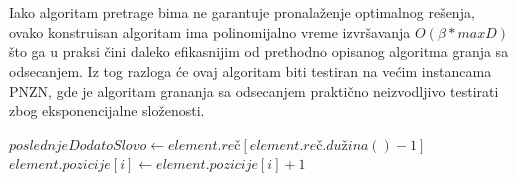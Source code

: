 \documentclass[12pt,oneside]{memoir}
\begin{document}
\begin{algorithm}
  \caption{$\textbf{RedukujBim}\bm{(\mathcal{B}\textbf{, }prona\textbf{đ}enaNadniska)}$}
  \label{alg:redukujbim}
  \end{algorithm}
\\
\\
Iako algoritam pretrage bima ne garantuje pronalaženje optimalnog rešenja, ovako konstruisan algoritam
ima polinomijalno vreme izvršavanja $O(\beta*maxD)$ što ga u praksi čini daleko efikasnijim od
prethodno opisanog algoritma granja sa odsecanjem. Iz tog razloga će ovaj algoritam biti testiran na
većim instancama PNZN, gde je algoritam grananja sa odsecanjem praktično neizvodljivo testirati
zbog eksponencijalne složenosti.
\\
\begin{algorithm}
  \caption{$\textbf{AžurirajPozicije}\bm{(element)}$}
  \label{alg:azurirajPozicije}
  \begin{algorithmic}[1]
    \State $poslednjeDodatoSlovo \gets element.re\textrm{č}[element.re\textrm{č}.du\textrm{ž}ina() - 1]$
    \State
            \State $element.pozicije[i] \gets element.pozicije[i] + 1$
      \EndIf
    \EndFor
  \end{algorithmic}
  \end{algorithm}
\end{document}

